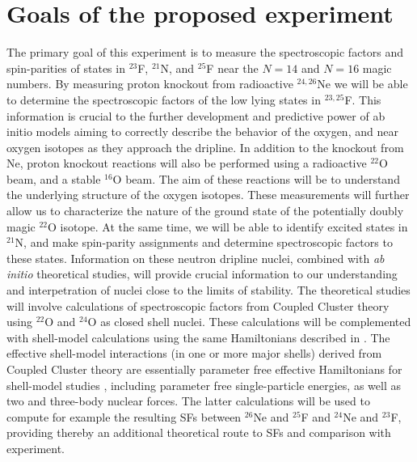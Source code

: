 \documentclass[prc,preprint,superscriptaddress,showpacs,floatfix]{revtex4-1}
\begin{document}
\section{Goals of the proposed experiment}
The primary goal of this experiment is to measure the spectroscopic
factors and spin-parities of states in $^{23}$F, $^{21}$N, and
$^{25}$F near the $N=14$ and $N=16$ magic numbers. By measuring proton
knockout from radioactive $^{24,26}$Ne we will be able to determine
the spectroscopic factors of the low lying states in $^{23,25}$F. This
information is crucial to the further development and predictive power
of ab initio models aiming to correctly describe the behavior of the
oxygen, and near oxygen isotopes as they approach the dripline. In
addition to the knockout from Ne, proton knockout reactions will also
be performed using a radioactive $^{22}$O beam, and a stable $^{16}$O
beam.  The aim of these reactions will be to understand the underlying
structure of the oxygen isotopes. These measurements will further
allow us to characterize the nature of the ground state of the
potentially doubly magic $^{22}$O isotope. At the same time, we will
be able to identify excited states in $^{21}$N, and make spin-parity
assignments and determine spectroscopic factors to these
states. Information on these neutron dripline nuclei, combined with
{\em ab initio} theoretical studies, will provide crucial information
to our understanding and interpetration of nuclei close to the limits
of stability. The theoretical studies will involve calculations of
spectroscopic factors from Coupled Cluster theory using $^{22}$O and
$^{24}$O as closed shell nuclei. These calculations will be
complemented with shell-model calculations using the same
Hamiltonians described in \cite{naturephysics2015,ekstrom2015}. The
effective shell-model interactions (in one or more major shells)
derived from Coupled Cluster theory are essentially parameter free
effective Hamiltonians for shell-model studies \cite{jansen2014}, including parameter free single-particle energies, as well as 
two and three-body nuclear forces.  The latter calculations
will be used to compute for example the resulting SFs between
$^{26}$Ne and $^{25}$F and $^{24}$Ne and $^{23}$F, providing thereby
an additional theoretical route to SFs and comparison with experiment. 
\end{document}

